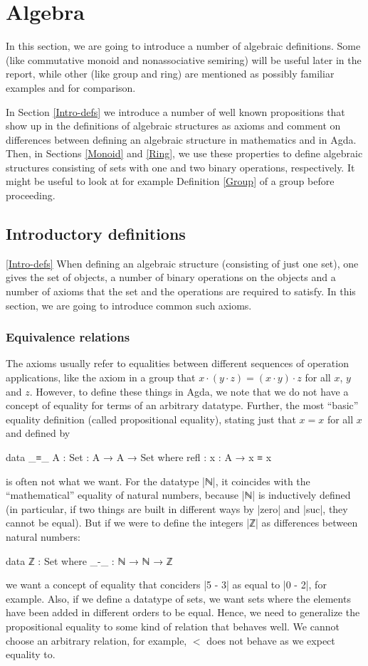 \section{Algebra}
In this section, we are going to introduce a number of algebraic definitions. Some (like commutative monoid and nonassociative semiring) will be useful later in the report, while other (like group and ring) are mentioned as possibly familiar examples and for comparison.

In Section \ref{Intro-defs} we introduce a number of well known propositions that show up in the definitions of algebraic structures as axioms and comment on differences between defining an algebraic structure in mathematics and in Agda. Then, in Sections \ref{Monoid} and \ref{Ring}, we use these properties to define algebraic structures consisting of sets with one and two binary operations, respectively. It might be useful to look at for example Definition \ref{Group} of a group before proceeding.
\subsection{Introductory definitions}
\ref{Intro-defs}
When defining an algebraic structure (consisting of just one set), one gives the set of objects, a number of binary operations on the objects and a number of axioms that the set and the operations are required to satisfy. In this section, we are going to introduce common such axioms. 
\subsubsection{Equivalence relations}
The axioms usually refer to equalities between different sequences of operation applications, like the axiom in a group that $x \cdot (y \cdot z) = (x \cdot y) \cdot z$ for all $x$, $y$ and $z$. However, to define these things in Agda, we note that we do not have a concept of equality for terms of an arbitrary datatype. Further, the most ``basic'' equality definition (called propositional equality), stating just that $x = x$ for all $x$ and defined by
\begin{code}
data _≡_ {A : Set} : A → A → Set where
  refl : {x : A} → x ≡ x
\end{code}
is often not what we want. For the datatype |ℕ|, it coincides with the ``mathematical'' equality of natural numbers, because |ℕ| is inductively defined (in particular, if two things are built in different ways by |zero| and |suc|, they cannot be equal). But if we were to define the integers |ℤ| as differences between natural numbers:
\begin{code}
data ℤ : Set where
  _-_ : ℕ → ℕ → ℤ
\end{code}
we want a concept of equality that conciders |5 - 3| as equal to |0 - 2|, for example. Also, if we define a datatype of sets, we want sets where the elements have been added in different orders to be equal. Hence, we need to generalize the propositional equality to some kind of relation that behaves well. We cannot choose an arbitrary relation, for example, $<$ does not behave as we expect equality to. 


